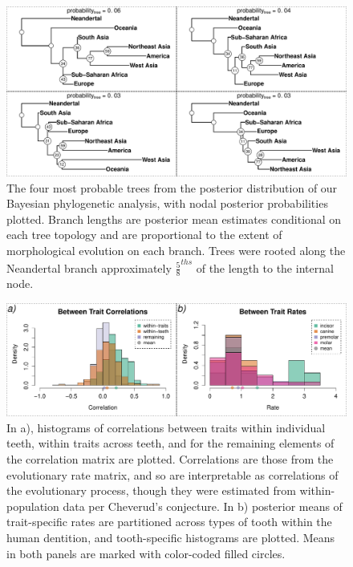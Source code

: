 \documentclass[10pt, twocolumn, twoside]{article}
\begin{document}
\begin{figure}[h]
\centering
\includegraphics[width=160mm]{figures/dental_top4trees.pdf}
\caption[Top Four Tree Topologies from Discrete Dental Phylogenetic Analysis]{The four most probable trees from the posterior distribution of our Bayesian phylogenetic analysis, with nodal posterior probabilities plotted. Branch lengths are posterior mean estimates conditional on  each tree topology and are proportional to the extent of morphological evolution on each branch. Trees were rooted along the Neandertal branch approximately $\frac{5}{8}^{ths}$ of the length to the internal node.  
\label{overflow}
\label{fig:top4treesDENTAL}}
\end{figure}

\begin{figure}[h]
\centering
\includegraphics[width=160mm]{figures/dental_rates_corrs.pdf}
\caption[Estimated Rates and Correlations of Discrete Dental Evolution]{In a), histograms of correlations between traits within individual teeth, within traits across teeth, and for the remaining elements of the correlation matrix are plotted. Correlations are those from the evolutionary rate matrix, and so are interpretable as correlations of the evolutionary process, though they were estimated from within-population data per Cheverud's conjecture. In b) posterior means of trait-specific rates are partitioned across types of tooth within the human dentition, and tooth-specific histograms are plotted. Means in both panels are marked with color-coded filled circles. \label{overflow}
\label{fig:dentalRatesCorrs}
}
\end{figure}
\end{document}
